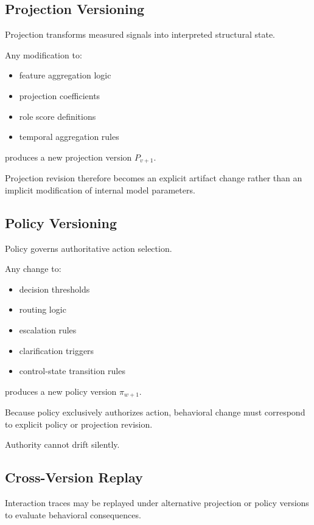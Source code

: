 \documentclass[11pt]{article}
\begin{document}
\subsection{Projection Versioning}

Projection transforms measured signals into interpreted structural state.

Any modification to:

\begin{itemize}
  \item feature aggregation logic
  \item projection coefficients
  \item role score definitions
  \item temporal aggregation rules
\end{itemize}

produces a new projection version $P_{v+1}$.

Projection revision therefore becomes an explicit artifact change rather than an implicit modification of internal model parameters.

\subsection{Policy Versioning}

Policy governs authoritative action selection.

Any change to:

\begin{itemize}
  \item decision thresholds
  \item routing logic
  \item escalation rules
  \item clarification triggers
  \item control-state transition rules
\end{itemize}

produces a new policy version $\pi_{w+1}$.

Because policy exclusively authorizes action, behavioral change must correspond to explicit policy or projection revision.

Authority cannot drift silently.

\subsection{Cross-Version Replay}

Interaction traces may be replayed under alternative projection or policy versions to evaluate behavioral consequences.
\end{document}
